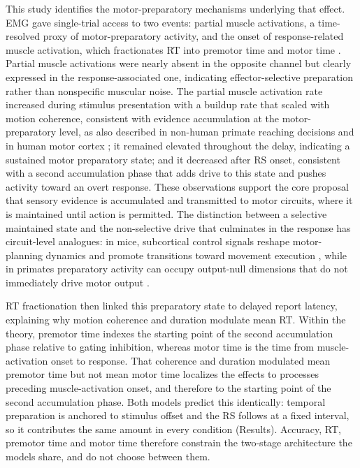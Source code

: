 \documentclass[a4paper,11pt]{article}
\theoremstyle{definition}
\newcommand{\1}{\mathbbm{1}}
\begin{document}
This study identifies the motor-preparatory mechanisms underlying that effect. EMG gave single-trial access to two events: partial muscle activations, a time-resolved proxy of motor-preparatory activity, and the onset of response-related muscle activation, which fractionates RT into premotor time and motor time \parencites{colesPsychophysiologicalInvestigationContinuous}{servantIntegratedTheoryDeciding2021}. Partial muscle activations were nearly absent in the opposite channel but clearly expressed in the response-associated one, indicating effector-selective preparation rather than nonspecific muscular noise. The partial muscle activation rate increased during stimulus presentation with a buildup rate that scaled with motion coherence, consistent with evidence accumulation at the motor-preparatory level, as also described in non-human primate reaching decisions and in human motor cortex \parencites{cisekNeuralCorrelatesReaching2005}{donnerBuildupChoicePredictiveActivity2009}{kellyInternalExternalInfluences2013}{roggeMotorCorticalSignals2022}{selenDeliberationMotorSystem2012}; it remained elevated throughout the delay, indicating a sustained motor preparatory state; and it decreased after RS onset, consistent with a second accumulation phase that adds drive to this state and pushes activity toward an overt response. These observations support the core proposal that sensory evidence is accumulated and transmitted to motor circuits, where it is maintained until action is permitted. The distinction between a selective maintained state and the non-selective drive that culminates in the response has circuit-level analogues: in mice, subcortical control signals reshape motor-planning dynamics and promote transitions toward movement execution \parencite{inagakiNeuralAlgorithmsCircuits2022}, while in primates preparatory activity can occupy output-null dimensions that do not immediately drive motor output \parencite{churchlandPreparatoryActivityExpansive2024}.

RT fractionation then linked this preparatory state to delayed report latency, explaining why motion coherence and duration modulate mean RT. Within the theory, premotor time indexes the starting point of the second accumulation phase relative to gating inhibition, whereas motor time is the time from muscle-activation onset to response. That coherence and duration modulated mean premotor time but not mean motor time localizes the effects to processes preceding muscle-activation onset, and therefore to the starting point of the second accumulation phase. Both models predict this identically: temporal preparation is anchored to stimulus offset and the RS follows at a fixed interval, so it contributes the same amount in every condition (Results). Accuracy, RT, premotor time and motor time therefore constrain the two-stage architecture the models share, and do not choose between them.
\end{document}
